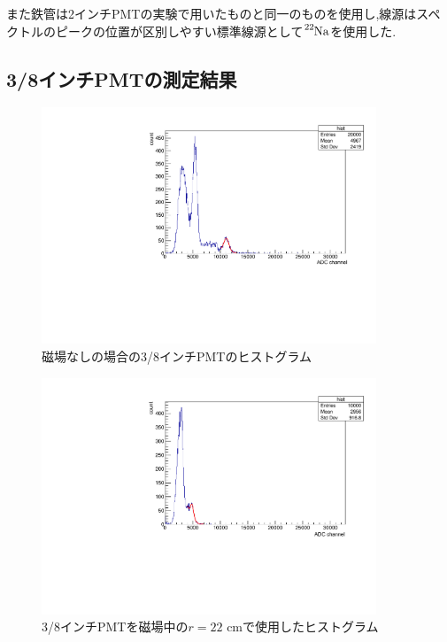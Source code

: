 また鉄管は2インチPMTの実験で用いたものと同一のものを使用し,線源はスペクトルのピークの位置が区別しやすい標準線源として$\ce{^{22}Na}$を使用した.


\subsection{3/8インチPMTの測定結果}

\begin{figure}[tbp]
	\centering
		\includegraphics[angle=-90,width=10cm]{fig/iguchi/minicoincidence2.pdf}
	\caption{磁場なしの場合の3/8インチPMTのヒストグラム}
	\label{histminicoincidence2}
\end{figure}

\begin{figure}[tbp]
	\centering
		\includegraphics[angle=-90,width=10cm]{fig/iguchi/minicoout22.pdf}
	\caption{3/8インチPMTを磁場中の$r=22$ cmで使用したヒストグラム}
	\label{histminicoout22}
\end{figure}

